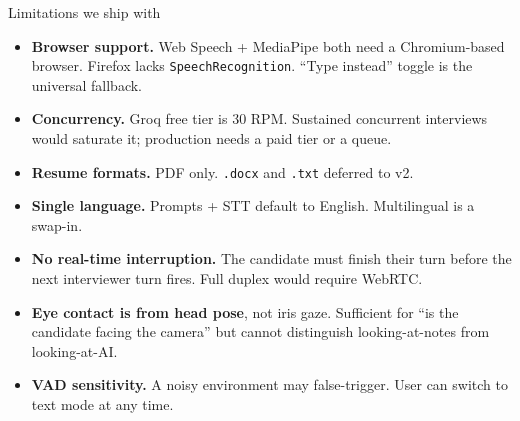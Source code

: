 \documentclass[aspectratio=169,10pt]{beamer}
\begin{document}
\begin{frame}{Limitations we ship with}
  \vspace{0.2cm}
  \footnotesize
  \begin{itemize}\setlength\itemsep{4pt}
    \item \textbf{Browser support.} Web Speech + MediaPipe both need a
          Chromium-based browser. Firefox lacks \texttt{SpeechRecognition}.
          ``Type instead'' toggle is the universal fallback.
    \item \textbf{Concurrency.} Groq free tier is 30 RPM. Sustained
          concurrent interviews would saturate it; production needs a
          paid tier or a queue.
    \item \textbf{Resume formats.} PDF only. \texttt{.docx} and \texttt{.txt}
          deferred to v2.
    \item \textbf{Single language.} Prompts + STT default to English.
          Multilingual is a swap-in.
    \item \textbf{No real-time interruption.} The candidate must finish
          their turn before the next interviewer turn fires. Full duplex
          would require WebRTC.
    \item \textbf{Eye contact is from head pose}, not iris gaze. Sufficient
          for ``is the candidate facing the camera'' but cannot
          distinguish looking-at-notes from looking-at-AI.
    \item \textbf{VAD sensitivity.} A noisy environment may false-trigger.
          User can switch to text mode at any time.
  \end{itemize}
\end{frame}
\end{document}
